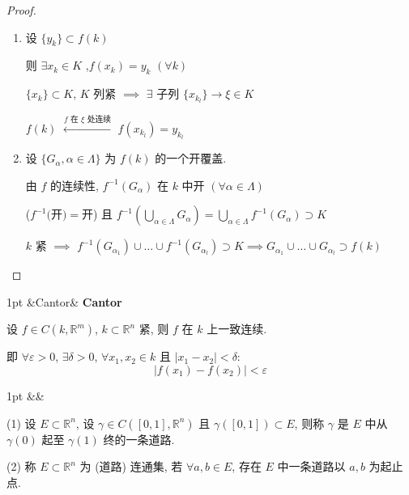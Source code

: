 \documentclass[a4paper]{article}
\newcommand{\R}{\mathbb{R}}
\newcommand{\st}{,\text{s.t.}}
\newenvironment{formal}[1][]{%
\def\FrameCommand{%
\hspace{1pt}%
{\color{formalline}\vrule width 2pt}%
{\color{formalshade}\vrule width 4pt}%
\colorbox{formalshade}%
}%
\MakeFramed{\advance\hsize-\width\FrameRestore}%
\noindent
\hspace{-4.55pt}%
\begin{adjustwidth}{}{1pt}%
\setlength{\parindent}{0pt}%
\vspace{3pt}%
\ifx&#1&\else %
\textbf{#1}\par
\vspace{1pt}%
\fi }{%
\vspace{2pt}%
\end{adjustwidth}\endMakeFramed%
}
\newenvironment{theorem}[1][]{%
\def\FrameCommand{%
\hspace{1pt}%
{\color{theoremline}\vrule width 2pt}%
{\color{theoremshade}\vrule width 4pt}%
\colorbox{theoremshade}%
}%
\MakeFramed{\advance\hsize-\width\FrameRestore}%
\noindent
\hspace{-4.55pt}%
\begin{adjustwidth}{}{1pt}%
\setlength{\parindent}{0pt}%
\vspace{3pt}%
\ifx&#1&\else %
\textbf{#1}\par
\vspace{1pt}%
\fi }{%
\vspace{2pt}%
\end{adjustwidth}\endMakeFramed%
}
\begin{document}
    \begin{proof}[Proof]
        \begin{enumerate}
            \item 设 $\{y_{k}\} \subset f(k)$

                则 $\exists x_{k}\in K$ \st $f(x_{k}) = y_{k}$ $(\forall k)$

                $\{x_{k}\} \subset K$, $K$ 列紧 $\implies$ $\exists$ 子列
                $\{x_{k_l}\} \to \xi \in K$

                $f(k)$ $\xleftarrow{f \text{ 在 } \xi \text{ 处连续}}$ $f(x_{k_l}
                ) = y_{k_l}$

            \item 设 $\{G_{\alpha}, \alpha \in \Lambda\}$ 为 $f(k)$ 的一个开覆盖.

                由 $f$ 的连续性, $f^{-1}(G_{\alpha})$ 在 $k$ 中开
                $(\forall \alpha \in \Lambda)$

                ($f^{-1}($开$)=$开) 且
                $f^{-1}(\bigcup_{\alpha \in \Lambda}G_{\alpha}) = \bigcup_{\alpha
                \in \Lambda}f^{-1}(G_{\alpha}) \supset K$

                $k$ 紧 $\implies$ $f^{-1}(G_{\alpha_1}) \cup \dots \cup f^{-1}(G_{\alpha_l}
                ) \supset K \implies G_{\alpha_1}\cup \dots \cup G_{\alpha_l}\supset
                f(k)$
        \end{enumerate}
    \end{proof}

    \begin{theorem}[Cantor]
        设 $f \in C(k, \mathbb{R}^{m})$, $k \subset \mathbb{R}^{n}$ 紧, 则 $f$ 在
        $k$ 上一致连续.

        即 $\forall \varepsilon > 0$, $\exists \delta > 0$, $\forall x_{1}, x_{2}
        \in k$ 且 $|x_{1}- x_{2}| < \delta$:
        \[
            |f(x_{1}) - f(x_{2})| < \varepsilon
        \]
    \end{theorem}

    \begin{formal}
        [连通] (1) 设 $E \subset \R^{n}$, 设 $\gamma \in C([0,1], \R^{n})$ 且
        $\gamma([0,1]) \subset E$, 则称 $\gamma$ 是 $E$ 中从 $\gamma(0)$ 起至 $\gamma
        (1)$ 终的一条道路.

        (2) 称 $E \subset \R^{n}$ 为 (道路) 连通集, 若 $\forall a, b \in E$, 存在
        $E$ 中一条道路以 $a, b$ 为起止点.
    \end{formal}
\end{document}
